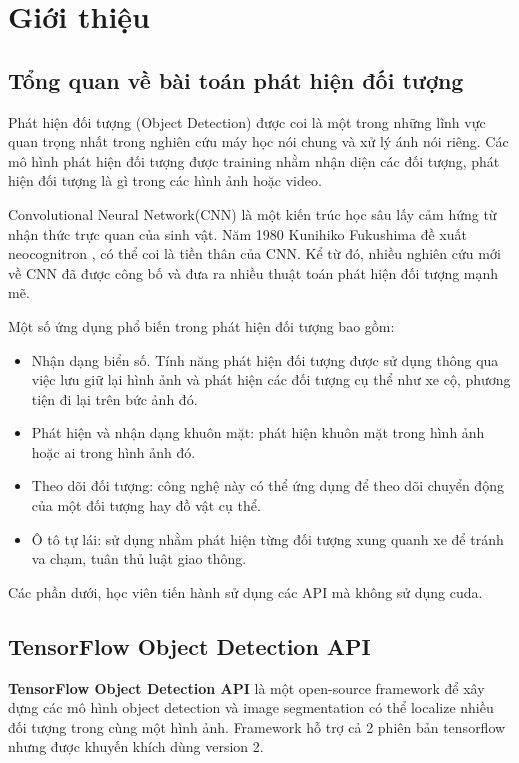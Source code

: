 \section{Giới thiệu}
\label{sec:introduction}

\subsection{Tổng quan về bài toán phát hiện đối tượng}

Phát hiện đối tượng (Object Detection) được coi là một trong những lĩnh vực quan trọng nhất trong nghiên cứu máy học nói chung và xử lý ánh nói riêng. Các mô hình phát hiện đối tượng được training nhằm nhận diện các đối tượng, phát hiện đối tượng là gì trong các hình ảnh hoặc video.

Convolutional Neural Network(CNN) là một kiến trúc học sâu lấy cảm hứng từ nhận thức trực quan của sinh vật. Năm 1980 Kunihiko Fukushima\cite{fukushima1980self} đề xuất neocognitron , có thể coi là tiền thân của CNN. Kể từ đó, nhiều nghiên cứu mới về CNN đã được công bố và đưa ra nhiều thuật toán phát hiện đối tượng mạnh mẽ.

Một số ứng dụng phổ biến trong phát hiện đối tượng bao gồm:
\begin{itemize}
    \item Nhận dạng biển số. Tính năng phát hiện đối tượng được sử dụng thông qua việc lưu giữ lại hình ảnh và phát hiện các đối tượng cụ thể như xe cộ, phương tiện đi lại trên bức ảnh đó.
    \item Phát hiện và nhận dạng khuôn mặt: phát hiện khuôn mặt trong hình ảnh hoặc ai trong hình ảnh đó.
    \item Theo dõi đối tượng: công nghệ này có thể ứng dụng để theo dõi chuyển động của một đối tượng hay đồ vật cụ thể.
    \item Ô tô tự lái: sử dụng nhằm phát hiện từng đối tượng xung quanh xe để tránh va chạm, tuân thủ luật giao thông.
\end{itemize}

Các phần dưới, học viên tiến hành sử dụng các API mà không sử dụng cuda.

\subsection{TensorFlow Object Detection API}

\textbf{TensorFlow Object Detection API} là một open-source framework để xây dựng các mô hình object detection và image segmentation có thể localize nhiều đối tượng trong cùng một hình ảnh. Framework hỗ trợ cả 2 phiên bản tensorflow nhưng được khuyến khích dùng version 2.

